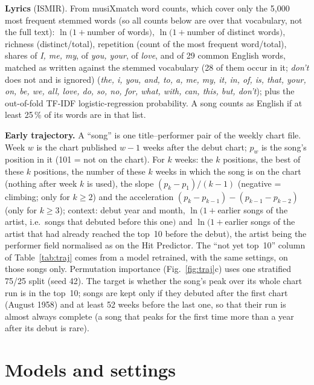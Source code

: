 \textbf{Lyrics} (ISMIR). From musiXmatch word counts, which cover only the 5{,}000 most frequent stemmed words
(so all counts below are over that vocabulary, not the full text): $\ln(1+{}$number of words$)$, $\ln(1+{}$number of
distinct words$)$,
richness (distinct/total), repetition (count of the most frequent word/total), shares of \emph{I, me,
my}, of \emph{you, your}, of \emph{love}, and of 29 common English words, matched as written against the stemmed vocabulary (28 of them occur in it;
\emph{don't} does not and is ignored) (\emph{the, i, you, and, to, a, me,
my, it, in, of, is, that, your, on, be, we, all, love, do, so, no, for, what, with, can, this, but, don't}); plus
the out-of-fold TF-IDF logistic-regression probability. A song counts as English if at least 25\,\% of its words
are in that list.

\textbf{Early trajectory.} A ``song'' is one title--performer pair of the weekly chart file. Week $w$ is the
chart published $w-1$ weeks after the debut chart; $p_w$ is the song's position in it (101 = not on the chart).
For $k$ weeks: the $k$ positions, the best of these $k$ positions, the number of these $k$ weeks in which the
song is on the chart (nothing after week $k$ is used), the slope
$(p_k-p_1)/(k-1)$ (negative = climbing; only for $k\geq2$) and the acceleration $(p_k-p_{k-1})-(p_{k-1}-p_{k-2})$
(only for $k\geq3$); context: debut year and month, $\ln(1+{}$earlier songs of the artist, i.e.\ songs that debuted before this one$)$ and
$\ln(1+{}$earlier songs of the artist that had already reached the top~10 before the debut$)$, the artist being
the performer field normalised as on the Hit Predictor. The ``not yet top~10'' column of Table~\ref{tab:traj} comes
from a model retrained, with the same settings, on those songs only. Permutation importance
(Fig.~\ref{fig:traj}c) uses one stratified 75/25 split (seed 42). The target is
whether the song's peak over its whole chart run is in the top~10; songs are kept only if they debuted after the
first chart (August 1958) and at least 52 weeks before the last one, so that their run is almost always complete
(a song that peaks for the first time more than a year after its debut is rare).

\FloatBarrier
\section{Models and settings}\label{app:models}

